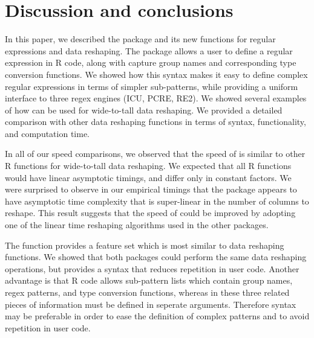 \section{Discussion and conclusions}

In this paper, we described the  package and its new functions
for regular expressions and data reshaping. The  package
allows a user to define a regular expression in R code, along with
capture group names and corresponding type conversion functions. We
showed how this syntax makes it easy to define complex regular
expressions in terms of simpler sub-patterns, while providing a
uniform interface to three regex engines (ICU, PCRE, RE2). We showed
several examples of how  can be used for wide-to-tall data
reshaping. We provided a detailed comparison with other data reshaping
functions in terms of syntax, functionality, and computation time.

In all of our speed comparisons, we observed that the speed of
 is similar to other R functions for wide-to-tall data
reshaping. We expected that all R functions would have linear
asymptotic timings, and differ only in constant factors. We were
surprised to observe in our empirical timings that the 
package appears to have asymptotic time complexity that is
super-linear in the number of columns to reshape. This result suggests
that the speed of  could be improved by adopting one of the
linear time reshaping algorithms used in the other packages.

The  function provides a feature set which
is most similar to  data reshaping functions. We showed that
both packages could perform the same data reshaping operations, but
 provides a syntax that reduces repetition in user
code. Another advantage is that  R code allows sub-pattern
lists which contain group names, regex patterns, and type conversion
functions, whereas in  these three related pieces of
information must be defined in seperate arguments. Therefore  syntax
may be preferable in order to ease the definition of complex patterns and
to avoid repetition in user code.

